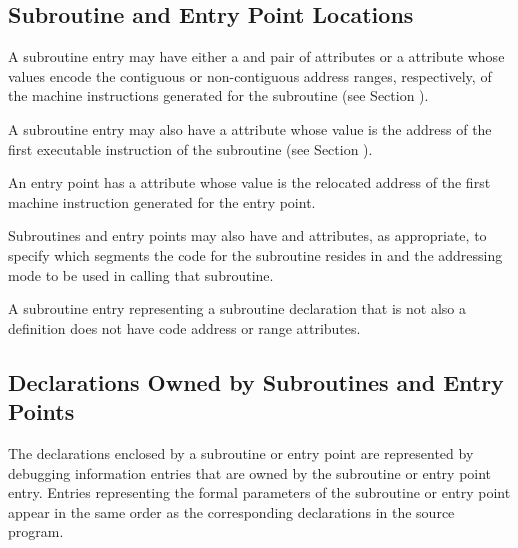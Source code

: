 \subsection{Subroutine and Entry Point Locations}
\label{chap:subroutineandentrypointlocations}

A subroutine entry may have either a \DWATlowpc{} and
\DWAThighpc{} pair of attributes or a \DWATranges{} attribute
whose 
values 
encode the contiguous or non-contiguous address
ranges, respectively, of the machine instructions generated
for the subroutine (see 
Section ).

A\hypertarget{chap:DWATentrypcentryaddressofsubprogram}{}
subroutine entry may also have a
\DWATentrypc{} attribute
whose value is the address of the first executable instruction
of the subroutine (see 
Section ).

An entry point has a \DWATlowpc{} attribute whose value is the
relocated address of the first machine instruction generated
for the entry point.


Subroutines and entry points may also have 
\DWATsegment{}\hypertarget{chap:DWATaddressclasssubroutineorsubroutinetype}{} 
 and
\DWATaddressclassDEFN{}
attributes, as appropriate, to specify
which segments the code for the subroutine resides in and
the addressing mode to be used in calling that subroutine.

A subroutine entry representing a subroutine declaration
that is not also a definition does not have code address or
range attributes.


\subsection{Declarations Owned by Subroutines and Entry Points} 
\label{chap:declarationsownedbysubroutinesandentrypoints}
The declarations enclosed by a subroutine or entry point are
represented by debugging information entries that are owned
by the subroutine or entry point entry. Entries representing
the formal parameters of the subroutine or entry point appear
in the same order as the corresponding declarations in the
source program.

